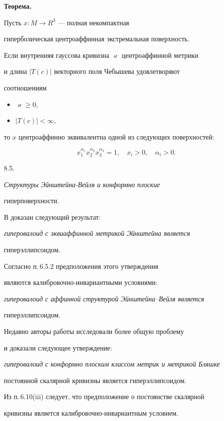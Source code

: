 {\bf Теорема.} 

Пусть $x:M \to R^3$ --- полная некомпактная

гиперболическая центроаффинная экстремальная поверхность.

Если внутренняя гауссова кривизна $\varkappa$ центроаффинной метрики

и длина $|T(c)|$ векторного поля Чебышева удовлетворяют

соотношениям

\begin{itemize}

\item[(i)] $\varkappa \geq 0$,

\item[(ii)] $|T(c)| < \infty$,

\end{itemize}

то $x$ центроаффинно эквивалентна одной из следующих поверхностей:

$$

x_1^{\alpha_1}x_2^{\alpha_2}x_3^{\alpha_3}=1,

\quad x_i >0, \quad \alpha_i >0.

$$





8.5. {\it Структуры Эйнштейна-Вейля и конформно плоские

гиперповерхности.} В \cite{KOZ-S} доказан следующий результат:

{\it гиперовалоид с эквиаффинной метрикой Эйнштейна является

гиперэллипсоидом.}

Согласно п.\,6.5.2 предположения этого утверждения

являются калибровочно-инвариантными условиями:

{\it гиперовалоид с аффинной структурой Эйнштейна--Вейля является

гиперэллипсоидом.}

Недавно авторы работы \cite{HU-Z} исследовали более общую проблему

и доказали следующее утверждение:

{\it гиперовалоид с конформно плоским классом метрик и метрикой Бляшке

постоянной скалярной кривизны является гиперэллипсоидом.}

Из п.\,6.10(iii) следует, что предположение о постоянстве скалярной

кривизны является калибровочно-инвариантным условием.

